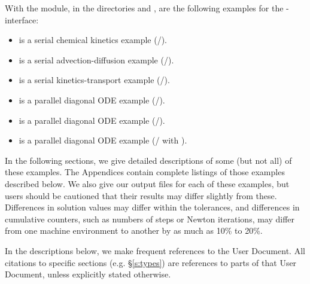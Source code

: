 With the {\fcvode} module, in the directories 
 and
, are the following examples for
the {\F}-{\C} interface:
\begin{itemize}
\item {} is a serial chemical kinetics example (/{\dense}).
\item {} is a serial advection-diffusion example (/{\band}).
\item {} is a serial kinetics-transport example (/{\spgmr}).
\item {} is a parallel diagonal ODE example
       (/).
\item {} is a parallel diagonal ODE example (/{\spgmr}).
\item {} is a parallel diagonal ODE example (/{\spgmr} with 
  {\fcvbbd}).
\end{itemize}

In the following sections, we give detailed descriptions of some (but
not all) of these examples.  The Appendices contain complete listings
of those examples described below.  We also give our output files for
each of these examples, but users should be cautioned that their
results may differ slightly from these.  Differences in solution
values may differ within the tolerances, and differences in cumulative
counters, such as numbers of steps or Newton iterations, may differ
from one machine environment to another by as much as 10\% to 20\%.

In the descriptions below, we make frequent references to the {\cvode}
User Document.  All citations to specific sections (e.g. \S\ref{s:types})
are references to parts of that User Document, unless explicitly stated
otherwise.

